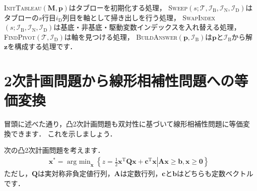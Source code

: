 \documentclass[a4paper]{jsarticle}
\begin{document}
\textsc{InitTableau}$(\boldsymbol{M},\boldsymbol{p})$はタブローを初期化する処理，
\textsc{Sweep}$(s;\mathcal{T},\mathcal{I}_{\mathrm{B}},\mathcal{I}_{\mathrm{N}},\mathcal{I}_{\mathrm{D}})$はタブローの$s$行目$i_{\mathrm{D}}$列目を軸として掃き出しを行う処理，
\textsc{SwapIndex}$(s;\mathcal{I}_{\mathrm{B}},\mathcal{I}_{\mathrm{N}},\mathcal{I}_{\mathrm{D}})$は基底・非基底・駆動変数インデックスを入れ替える処理，
\textsc{FindPivot}$(\mathcal{T},\mathcal{I}_{\mathrm{D}})$は軸を見つける処理，
\textsc{BuildAnswer}$(\boldsymbol{p},\mathcal{I}_{\mathrm{B}})$は$\boldsymbol{p}$と$\mathcal{I}_{\mathrm{B}}$から解$\boldsymbol{z}$を構成する処理です．



\section{2次計画問題から線形相補性問題への等価変換}

冒頭に述べた通り，凸2次計画問題も双対性に基づいて線形相補性問題に等価変換できます．
これを示しましょう．

次の凸2次計画問題を考えます．
\begin{align*}
\boldsymbol{x}^{*}=\mathop{\mathrm{arg~min}}_{\boldsymbol{x}}\left\{
\left.
z=\frac{1}{2}\boldsymbol{x}^{\mathrm{T}}\boldsymbol{Q}\boldsymbol{x}+\boldsymbol{c}^{\mathrm{T}}\boldsymbol{x}
\right|
\boldsymbol{A}\boldsymbol{x}\geq\boldsymbol{b},
\boldsymbol{x}\geq\boldsymbol{0}
\right\}
\end{align*}
ただし，$\boldsymbol{Q}$は実対称非負定値行列，$\boldsymbol{A}$は定数行列，$\boldsymbol{c}$と$\boldsymbol{b}$はどちらも定数ベクトルです．
\end{document}
